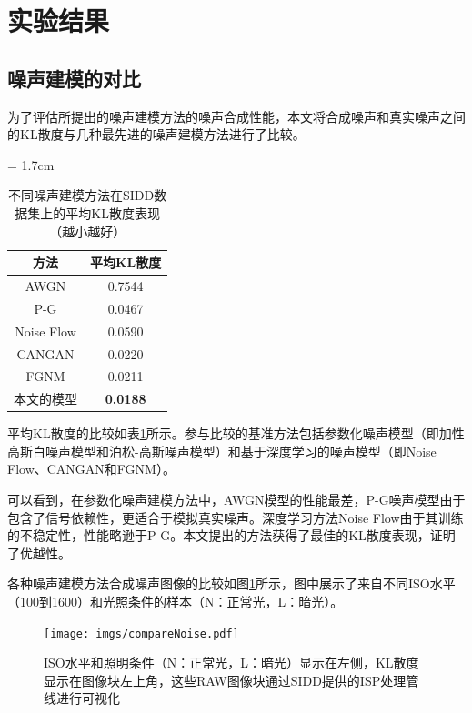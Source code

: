 \section{实验结果}



\subsection{噪声建模的对比}

为了评估所提出的噪声建模方法的噪声合成性能，本文将合成噪声和真实噪声之间的KL散度与几种最先进的噪声建模方法进行了比较。
\begin{table}[htbp]
	\begin{center}
		\tabcolsep = 1.7cm
		\caption{不同噪声建模方法在SIDD数据集上的平均KL散度表现（越小越好）}
		\label{compareNoise}
		\begin{tabular}{c|c}
			\toprule[1.5pt]
			方法 & 平均KL散度\\
			\midrule [1pt]
			AWGN & 0.7544\\
			P-G \cite{foi2008noise} & 0.0467\\
			Noise Flow \cite{noiseflow} & 0.0590 \\
			CANGAN \cite{learningcamera} & 0.0220\\
			FGNM \cite{co}& 0.0211\\
			\midrule[1pt]
			本文的模型& \textbf{0.0188}\\
			
			\bottomrule[1.5pt]
		\end{tabular}
	\end{center}
\end{table}

平均KL散度的比较如表\ref{compareNoise}所示。参与比较的基准方法包括参数化噪声模型（即加性高斯白噪声模型和泊松-高斯噪声模型\cite{foi2008noise}）和基于深度学习的噪声模型（即Noise Flow\cite{noiseflow}、CANGAN\cite{learningcamera}和FGNM\cite{co}）。

可以看到，在参数化噪声建模方法中，AWGN模型的性能最差，P-G噪声模型由于包含了信号依赖性，更适合于模拟真实噪声。深度学习方法Noise Flow\cite{noiseflow}由于其训练的不稳定性，性能略逊于P-G。本文提出的方法获得了最佳的KL散度表现，证明了优越性。

各种噪声建模方法合成噪声图像的比较如图\ref{fig:compareNoise}所示，图中展示了来自不同ISO水平（100到1600）和光照条件的样本（N：正常光，L：暗光）。

\begin{figure}[h]
	\centering
	\texttt{[image: imgs/compareNoise.pdf]}
	\caption{ISO水平和照明条件（N：正常光，L：暗光）显示在左侧，KL散度显示在图像块左上角，这些RAW图像块通过SIDD提供的ISP处理管线进行可视化}
	\label{fig:compareNoise}
\end{figure}

